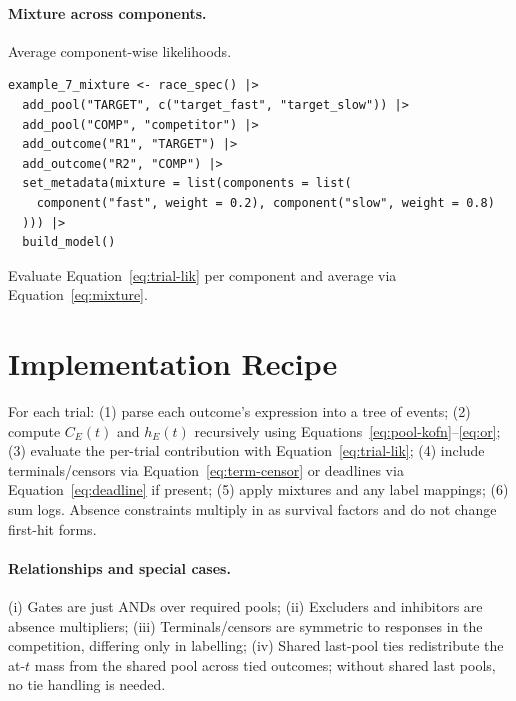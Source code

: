 \documentclass[11pt]{article}
\begin{document}
\paragraph{Mixture across components.} Average component-wise likelihoods.
\begin{verbatim}
example_7_mixture <- race_spec() |>
  add_pool("TARGET", c("target_fast", "target_slow")) |>
  add_pool("COMP", "competitor") |>
  add_outcome("R1", "TARGET") |>
  add_outcome("R2", "COMP") |>
  set_metadata(mixture = list(components = list(
    component("fast", weight = 0.2), component("slow", weight = 0.8)
  ))) |>
  build_model()
\end{verbatim}
Evaluate Equation~\eqref{eq:trial-lik} per component and average via Equation~\eqref{eq:mixture}.
\section{Implementation Recipe}
For each trial: (1) parse each outcome's expression into a tree of events; (2) compute $C_E(t)$ and $h_E(t)$ recursively using Equations~\eqref{eq:pool-kofn}--\eqref{eq:or}; (3) evaluate the per-trial contribution with Equation~\eqref{eq:trial-lik}; (4) include terminals/censors via Equation~\eqref{eq:term-censor} or deadlines via Equation~\eqref{eq:deadline} if present; (5) apply mixtures and any label mappings; (6) sum logs. Absence constraints multiply in as survival factors and do not change first-hit forms.
\paragraph{Relationships and special cases.} (i) Gates are just ANDs over required pools; (ii) Excluders and inhibitors are absence multipliers; (iii) Terminals/censors are symmetric to responses in the competition, differing only in labelling; (iv) Shared last-pool ties redistribute the at-$t$ mass from the shared pool across tied outcomes; without shared last pools, no tie handling is needed.
\end{document}
